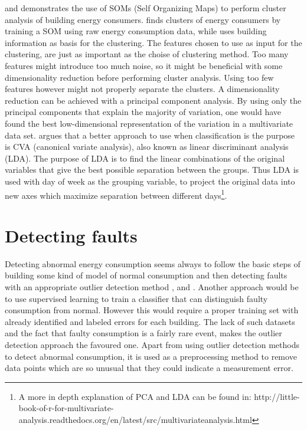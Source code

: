 \cite{Benchmarking1} and \cite{Benchmarking2} demonstrates the use of SOMs (Self Organizing Maps) to perform cluster analysis of building energy consumers. \cite{Benchmarking1} finds clusters of energy consumers by training a SOM using raw energy consumption data, while \cite{Benchmarking2} uses building information as basis for the clustering. The features chosen to use as input for the clustering, are just as important as the choise of clustering method. Too many features might introduce too much noise, so it might be beneficial with some dimensionality reduction before performing cluster analysis. Using too few features however might not properly separate the clusters. A dimensionality reduction can be achieved with a principal component analysis. By using only the principal components that explain the majority of variation, one would have found the best low-dimensional representation of the variation in a multivariate data set. \cite{faultdetec2} argues that a better approach to use when classification is the purpose is CVA (canonical variate analysis), also known as linear discriminant analysis (LDA). The purpose of LDA is to find the linear combinations of the original variables that give the best possible separation between the groups. Thus LDA is used with day of week as the grouping variable, to project the original data into new axes which maximize separation between different days\footnote{A more in depth explanation of PCA and LDA can be found in: http://little-book-of-r-for-multivariate-analysis.readthedocs.org/en/latest/src/multivariateanalysis.html}.
\section{Detecting faults}
Detecting abnormal energy consumption seems always to follow the basic steps of building some kind of model of normal consumption and then detecting faults with an appropriate outlier detection method \cite{faultdetec1}, \cite{faultdetec2} and \cite{faultdetec3}. Another approach would be to use supervised learning to train a classifier that can distinguish faulty consumption from normal. However this would require a proper training set with already identified and labeled errors for each building. The lack of such datasets and the fact that faulty consumption is a fairly rare event, makes the outlier detection approach the favoured one. Apart from using outlier detection methods to detect abnormal consumption, it is used as a preprocessing method to remove data points which are so unusual that they could indicate a measurement error.

